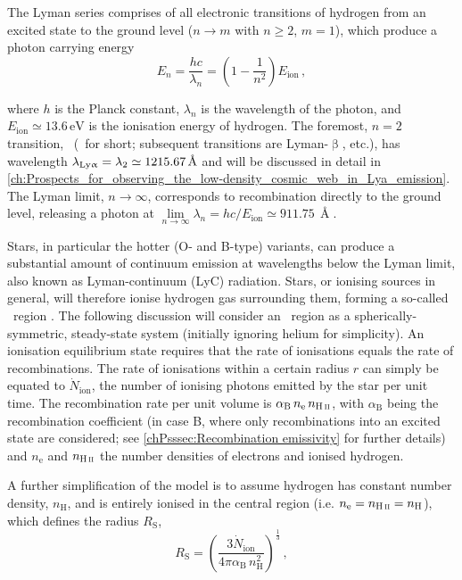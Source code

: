 The Lyman series comprises of all electronic transitions of hydrogen from an excited state to the ground level ($n \rightarrow m$ with $n \geq 2$, $m = 1$), which produce a photon carrying energy
\begin{equation}
    \label{chIeq:Lyman_series_energies}
    E_n = \frac{hc}{\lambda_n} = \left( 1 - \frac{1}{n^2} \right) E_\text{ion} \, ,
\end{equation}

\noindent where $h$ is the Planck constant, $\lambda_n$ is the wavelength of the photon, and $E_\text{ion} \simeq 13.6 \, \mathrm{eV}$ is the ionisation energy of hydrogen. The foremost, $n = 2$ transition, \lymana\ (\lya\ for short; subsequent transitions are Lyman-$\upbeta$, etc.), has wavelength $\lambda_\text{{Ly\ensuremath{\upalpha}}} = \lambda_2 \simeq 1215.67 \, \text{\AA}$ and will be discussed in detail in \cref{ch:Prospects_for_observing_the_low-density_cosmic_web_in_Lya_emission}. The Lyman limit, $n \rightarrow \infty$, corresponds to recombination directly to the ground level, releasing a photon at $\lim\limits_{n \rightarrow \infty} \lambda_n = hc/E_\text{ion} \simeq 911.75 \, \Angstrom$.

Stars, in particular the hotter (O- and B-type) variants, can produce a substantial amount of continuum emission at wavelengths below the Lyman limit, also known as Lyman-continuum (LyC) radiation. Stars, or ionising sources in general, will therefore ionise hydrogen gas surrounding them, forming a so-called \HII\ region \citep{1939ApJ....89..526S}. The following discussion will consider an \HII\ region as a spherically-symmetric, steady-state system (initially ignoring helium for simplicity). An ionisation equilibrium state requires that the rate of ionisations equals the rate of recombinations. The rate of ionisations within a certain radius $r$ can simply be equated to $\dot{N}_\text{ion}$, the number of ionising photons emitted by the star per unit time. The recombination rate per unit volume is $\alpha_\text{B} \, n_\text{e} \, n_\text{\HII}$, with $\alpha_\text{B}$ being the recombination coefficient (in case B, where only recombinations into an excited state are considered; see \cref{chPsssec:Recombination emissivity} for further details) and $n_\text{e}$ and $n_\text{\HII}$ the number densities of electrons and ionised hydrogen.

A further simplification of the model is to assume hydrogen has constant number density, $n_\text{H}$, and is entirely ionised in the central region (i.e. $n_\text{e} = n_\text{\HII} = n_\text{H}$), which defines the \citeauthor{1939ApJ....89..526S} radius $R_\text{S}$,
\begin{equation}
    \label{chIeq:Photoionisation_equilibrium}
    R_\text{S} = \left( \frac{3 \dot{N}_\text{ion}}{4 \pi \alpha_\text{B} \, n_\text{H}^2} \right)^\frac{1}{3} \, ,
\end{equation}


